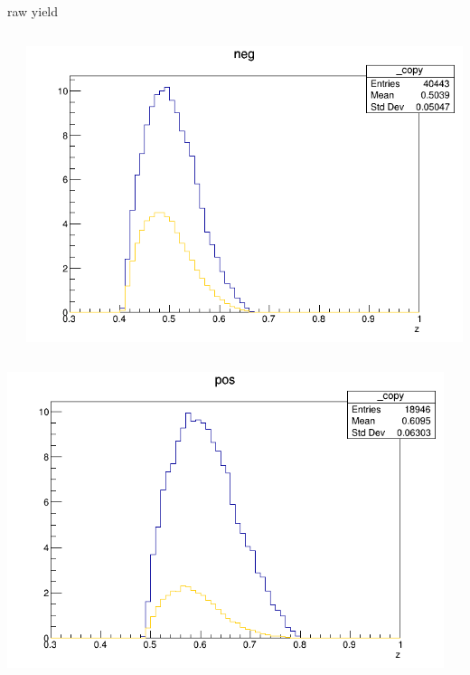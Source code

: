 \begin{frame}{raw yield}
\begin{columns}
\begin{column}[T]{0.25\textwidth}
\end{column}
\begin{column}[T]{0.25\textwidth}
\includegraphics[width = \textwidth]{results/yield/statistics/yield_x_Q2_z_0.55_4.764_0.50_neg.png}
\end{column}
\end{columns}
\begin{columns}
\begin{column}[T]{0.25\textwidth}
\includegraphics[width = \textwidth]{results/yield/statistics/yield_x_Q2_z_0.55_4.764_0.60_pos.png}
\end{column}
\begin{column}[T]{0.25\textwidth}

\end{column}
\end{columns}
\end{frame}
